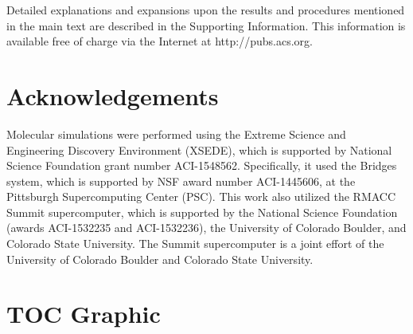 \documentclass{article}
\begin{document}
  Detailed explanations and expansions upon the results and procedures mentioned in
  the main text are described in the Supporting Information. This information is
  available free of charge via the Internet at http://pubs.acs.org.

  \section*{Acknowledgements}

  Molecular simulations were performed using the Extreme Science and
  Engineering Discovery Environment (XSEDE), which is supported by National
  Science Foundation grant number ACI-1548562. Specifically, it used the Bridges
  system, which is supported by NSF award number ACI-1445606, at the Pittsburgh
  Supercomputing Center (PSC). This work also utilized the RMACC Summit supercomputer,
  which is supported by the National Science Foundation (awards ACI-1532235 and
  ACI-1532236), the University of Colorado Boulder, and Colorado State
  University. The Summit supercomputer is a joint effort of the University of
  Colorado Boulder and Colorado State University.

  \clearpage

  
  

  \newpage

  \section*{TOC Graphic}
\end{document}
